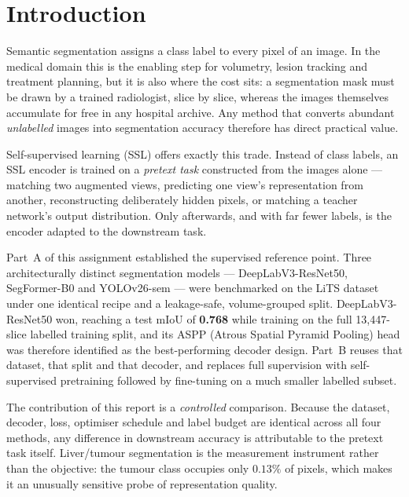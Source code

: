 \documentclass[conference]{IEEEtran}
\begin{document}
\section{Introduction}

Semantic segmentation assigns a class label to every pixel of an image. In the
medical domain this is the enabling step for volumetry, lesion tracking and
treatment planning, but it is also where the cost sits: a segmentation mask must
be drawn by a trained radiologist, slice by slice, whereas the images themselves
accumulate for free in any hospital archive. Any method that converts abundant
\emph{unlabelled} images into segmentation accuracy therefore has direct
practical value.

Self-supervised learning (SSL) offers exactly this trade. Instead of class
labels, an SSL encoder is trained on a \emph{pretext task} constructed from the
images alone --- matching two augmented views, predicting one view's
representation from another, reconstructing deliberately hidden pixels, or
matching a teacher network's output distribution. Only afterwards, and with far
fewer labels, is the encoder adapted to the downstream task.

Part~A of this assignment established the supervised reference point. Three
architecturally distinct segmentation models --- DeepLabV3-ResNet50,
SegFormer-B0 and YOLOv26-sem --- were benchmarked on the LiTS dataset under one
identical recipe and a leakage-safe, volume-grouped split. DeepLabV3-ResNet50
won, reaching a test mIoU of \textbf{0.768} while training on the full
13{,}447-slice labelled training split, and its ASPP (Atrous Spatial Pyramid
Pooling) head was therefore identified as the best-performing decoder design.
Part~B reuses that dataset, that split and that decoder, and replaces full
supervision with self-supervised pretraining followed by fine-tuning on a much
smaller labelled subset.

The contribution of this report is a \emph{controlled} comparison. Because the
dataset, decoder, loss, optimiser schedule and label budget are identical across
all four methods, any difference in downstream accuracy is attributable to the
pretext task itself. Liver/tumour segmentation is the measurement instrument
rather than the objective: the tumour class occupies only $0.13\%$ of pixels,
which makes it an unusually sensitive probe of representation quality.

\end{document}
